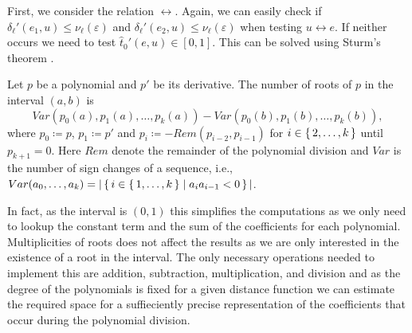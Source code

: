 First, we consider the relation \(\leftrightarrow\). Again, we can easily check if \(\delta_\ell'(e_1, u) \leq \nu_\ell(\varepsilon)\) and \(\delta_\ell'(e_2, u) \leq \nu_\ell(\varepsilon)\) when testing \(u \leftrightarrow e\). If neither occurs we need to test \(\hat t_0'(e, u) \in [0,1]\). This can be solved using Sturm's theorem \cite{algorithms_in_real_algebraic_geometry}. 
\begin{theorem}
  Let \(p\) be a polynomial and \(p'\) be its derivative. The number of roots of \(p\) in the interval \((a,b)\) is 
  \[Var(p_0(a), p_1(a), \dots, p_k(a)) - Var(p_0(b), p_1(b), \dots, p_k(b)),\]
  where \(p_0 \coloneq p\), \(p_1 \coloneq p'\) and \(p_i \coloneq -Rem(p_{i-2}, p_{i-1})\) for \(i \in \set{2, \dots, k}\) until \(p_{k+1} = 0\). 
  Here \(Rem\) denote the remainder of the polynomial division and \(Var\) is the number of sign changes of a sequence, i.e., \(Var(a_0,\dots, a_k) = |\set{i \in \set{1, \dots, k} \mid a_ia_{i-1} < 0}|\).
\end{theorem}

In fact, as the interval is \((0, 1)\) this simplifies the computations as we only need to lookup the constant term and the sum of the coefficients for each polynomial. 
Multiplicities of roots does not affect the results as we are only interested in the existence of a root in the interval. 
The only necessary operations needed to implement this are addition, subtraction, multiplication, and division and as the degree of the polynomials is fixed for a given distance function we can estimate the required space for a suffieciently precise representation of the coefficients that occur during the polynomial division. 







